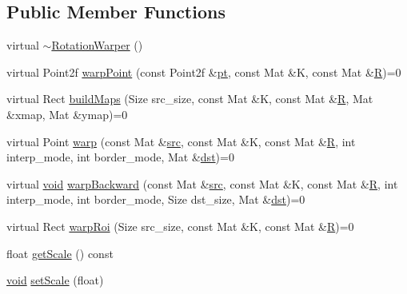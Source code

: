 \subsection*{Public Member Functions}
\begin{DoxyCompactItemize}
\item 
virtual \hyperlink{classcv_1_1detail_1_1RotationWarper_a1ae345a2e77c4afe0175215c791334d2}{$\sim$\-Rotation\-Warper} ()
\item 
virtual Point2f \hyperlink{classcv_1_1detail_1_1RotationWarper_a0ef604efd67eea8821209fd6f28b0f91}{warp\-Point} (const Point2f \&\hyperlink{objdetect_8hpp_a69c6090aa56793ec8ef2457bc6d45b45}{pt}, const Mat \&K, const Mat \&\hyperlink{imgproc__c_8h_a51837f120208319f026dc8c4a71e56e0}{R})=0
\item 
virtual Rect \hyperlink{classcv_1_1detail_1_1RotationWarper_a802ed92a1db4035b9bc33f38f4e96673}{build\-Maps} (Size src\-\_\-size, const Mat \&K, const Mat \&\hyperlink{imgproc__c_8h_a51837f120208319f026dc8c4a71e56e0}{R}, Mat \&xmap, Mat \&ymap)=0
\item 
virtual Point \hyperlink{classcv_1_1detail_1_1RotationWarper_a2c80c045287f1f4c5a903bdaa209f468}{warp} (const Mat \&\hyperlink{legacy_8hpp_a371cd109b74033bc4366f584edd3dacc}{src}, const Mat \&K, const Mat \&\hyperlink{imgproc__c_8h_a51837f120208319f026dc8c4a71e56e0}{R}, int interp\-\_\-mode, int border\-\_\-mode, Mat \&\hyperlink{photo__c_8h_aed13e2a25279b24dc954073233fef7a5}{dst})=0
\item 
virtual \hyperlink{legacy_8hpp_a8bb47f092d473522721002c86c13b94e}{void} \hyperlink{classcv_1_1detail_1_1RotationWarper_a37992e25622931e33bc402aa42e8f8de}{warp\-Backward} (const Mat \&\hyperlink{legacy_8hpp_a371cd109b74033bc4366f584edd3dacc}{src}, const Mat \&K, const Mat \&\hyperlink{imgproc__c_8h_a51837f120208319f026dc8c4a71e56e0}{R}, int interp\-\_\-mode, int border\-\_\-mode, Size dst\-\_\-size, Mat \&\hyperlink{photo__c_8h_aed13e2a25279b24dc954073233fef7a5}{dst})=0
\item 
virtual Rect \hyperlink{classcv_1_1detail_1_1RotationWarper_a10e953cc9d9a5b88e736f3b68de91f0d}{warp\-Roi} (Size src\-\_\-size, const Mat \&K, const Mat \&\hyperlink{imgproc__c_8h_a51837f120208319f026dc8c4a71e56e0}{R})=0
\item 
float \hyperlink{classcv_1_1detail_1_1RotationWarper_aec8eebee3a65efba9d110f2b819c9357}{get\-Scale} () const 
\item 
\hyperlink{legacy_8hpp_a8bb47f092d473522721002c86c13b94e}{void} \hyperlink{classcv_1_1detail_1_1RotationWarper_aee889077080ac6891f15cfbb675f939b}{set\-Scale} (float)
\end{DoxyCompactItemize}


